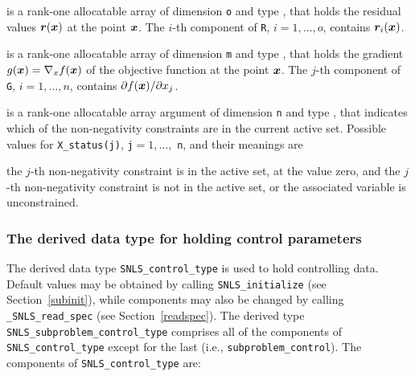 \documentclass{galahad}
\newcommand{\packagename}{SNLS}
\newcommand{\fullpackagename}{\libraryname\_\packagename}
\begin{document}
\begin{description}
 is a rank-one allocatable array of dimension {\tt o} and type
\realdp, that holds the residual values ${\bm{r}}({\bm{x}})$
at the point ${\bm{x}}$. The $i$-th component of
{\tt R}, $i = 1, \ldots, o$, contains ${\bm{r}}_{i}({\bm{x}})$.

 is a rank-one allocatable array of dimension {\tt m} and type
\realdp, that holds the gradient $g({\bm{x}}) = \nabla_x f({\bm{x}})$ of the
objective function at the point ${\bm{x}}$. The $j$-th component of
{\tt G}, $i = 1, \ldots, n$, contains $\partial f({\bm{x}})/\partial x_j$.

 is a rank-one allocatable array argument of dimension {\tt n}
and type \integer, that indicates which of the non-negativity constraints
are in the current active set. Possible values for
{\tt X\_status(j)}, {\tt j}$=1, \ldots ,$ {\tt n}, and their meanings are
\begin{description}
 the $j$-th non-negativity constraint
is in the active set, at the value zero, and
  the $j$-th non-negativity constraint is not in the active set,
or the associated variable is unconstrained.
\end{description}

\end{description}


\subsubsection{The derived data type for holding control
 parameters}\label{typecontrol}
The derived data type
{\tt \packagename\_control\_type}
is used to hold controlling data. Default values may be obtained by calling
{\tt \packagename\_initialize}
(see Section~\ref{subinit}),
while components may also be changed by calling
{\tt \fullpackagename\_read\-\_spec}
(see Section~\ref{readspec}).
The derived type {\tt \packagename\_subproblem\_control\_type}
comprises all of the components of {\tt \packagename\_control\_type}
except for the last (i.e., {\tt subproblem\_control}).
The components of
{\tt \packagename\_control\_type}
are:
\end{document}
